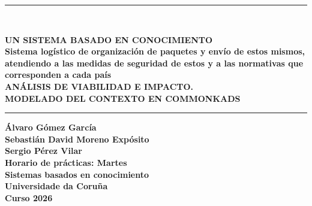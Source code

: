 \documentclass[12pt,a4paper,twoside,spanish]{article}      %
\begin{document}
\def\chaptername{Capítulo}
\def\tablename{Tabla}
\def\listtablename{Índice de Tablas}
\chapterfont{\LARGE\raggedleft}

\pagestyle{empty}

\begin{titlepage}
\setlength{\parindent}{0cm} \setlength{\parskip}{0cm}


\newcommand{\HRule}{\rule{\linewidth}{1mm}}

\vspace*{2cm}
\HRule \\[0.5cm]
\begin{center}
\textsf{\textbf{\large UN SISTEMA BASADO EN CONOCIMIENTO\\[0.4cm]
{\normalsize Sistema logístico de organización de paquetes y envío de estos mismos, atendiendo a las medidas de seguridad de estos y a las normativas que corresponden a cada país}\\[0.75cm]
ANÁLISIS DE VIABILIDAD E IMPACTO. \\[0.25cm] MODELADO DEL CONTEXTO EN COMMONKADS \\[0.5cm]}}
\HRule \vspace*{3cm}

\textsf{\textbf{\normalsize Álvaro Gómez García\\
Sebastián David Moreno Expósito\\
Sergio Pérez Vilar\\[4cm]
Horario de prácticas: Martes\\[2.5cm]
Sistemas basados en conocimiento\\
Universidade da Coruña \\ Curso
2026}}
\end{center}
\end{titlepage}

\cleardoublepage


\tableofcontents
\cleardoublepage


\end{document}
